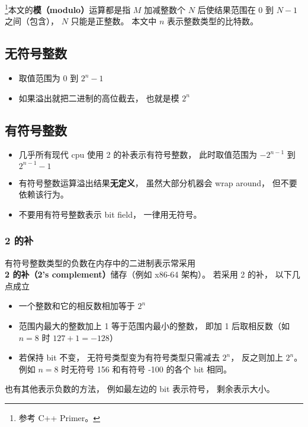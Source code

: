 

\footnote{参考 C++ Primer\cite{CppPr}。}本文的\textbf{模（modulo）}运算都是指 $M$ 加减整数个 $N$ 后使结果范围在 $0$ 到 $N-1$ 之间（包含）， $N$ 只能是正整数。 本文中 $n$ 表示整数类型的比特数。

\subsection{无符号整数}
\begin{itemize}
\item 取值范围为 $0$ 到 $2^n-1$
\item 如果溢出就把二进制的高位截去， 也就是模 $2^n$
\end{itemize}

\subsection{有符号整数}
\begin{itemize}
\item 几乎所有现代 cpu 使用 2 的补表示有符号整数， 此时取值范围为 $-2^{n-1}$ 到 $2^{n-1}-1$
\item 有符号整数运算溢出结果\textbf{无定义}， 虽然大部分机器会 wrap around， 但不要依赖该行为。
\item 不要用有符号整数表示 bit field， 一律用无符号。
\end{itemize}

\subsubsection{2 的补}
有符号整数类型的负数在内存中的二进制表示常采用 \textbf{2 的补（2's complement）}储存（例如 x86-64 架构）。 若采用 2 的补， 以下几点成立
\begin{itemize}
\item 一个整数和它的相反数相加等于 $2^n$
\item 范围内最大的整数加上 1 等于范围内最小的整数， 即加 1 后取相反数（如 $n = 8$ 时 $127 + 1 = -128$）
\item 若保持 bit 不变， 无符号类型变为有符号类型只需减去 $2^n$， 反之则加上 $2^n$。 例如 $n = 8$ 时无符号 156 和有符号 -100 的各个 bit 相同。
\end{itemize}

也有其他表示负数的方法， 例如最左边的 bit 表示符号， 剩余表示大小。

